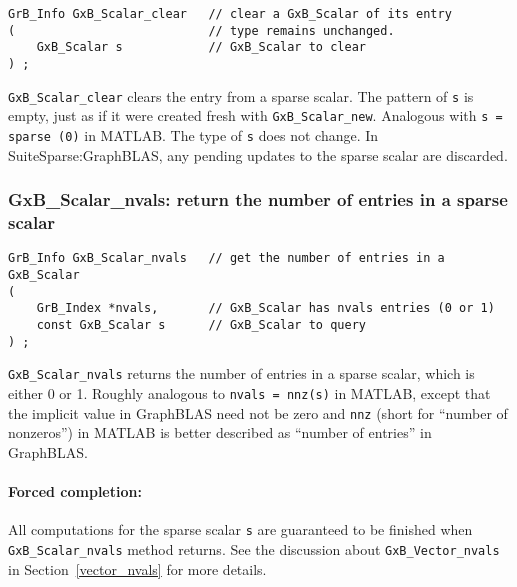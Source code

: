 \documentclass[12pt]{article}
\begin{document}
\begin{mdframed}[userdefinedwidth=6in]
{\footnotesize
\begin{verbatim}
GrB_Info GxB_Scalar_clear   // clear a GxB_Scalar of its entry
(                           // type remains unchanged.
    GxB_Scalar s            // GxB_Scalar to clear
) ;
\end{verbatim}
} \end{mdframed}

\verb'GxB_Scalar_clear' clears the entry from a sparse scalar.  The pattern of
\verb's' is empty, just as if it were created fresh with \verb'GxB_Scalar_new'.
Analogous with \verb's = sparse (0)' in MATLAB.  The type of \verb's' does not
change.  In SuiteSparse:GraphBLAS, any pending updates to the sparse scalar are
discarded.

\newpage
\subsubsection{{\sf GxB\_Scalar\_nvals:} return the number of entries in a sparse scalar}
\label{scalar_nvals}

\begin{mdframed}[userdefinedwidth=6in]
{\footnotesize
\begin{verbatim}
GrB_Info GxB_Scalar_nvals   // get the number of entries in a GxB_Scalar
(
    GrB_Index *nvals,       // GxB_Scalar has nvals entries (0 or 1)
    const GxB_Scalar s      // GxB_Scalar to query
) ;
\end{verbatim}
} \end{mdframed}

\verb'GxB_Scalar_nvals' returns the number of entries in a sparse scalar, which
is either 0 or 1.  Roughly analogous to \verb'nvals = nnz(s)' in MATLAB, except
that the implicit value in GraphBLAS need not be zero and \verb'nnz' (short for
``number of nonzeros'') in MATLAB is better described as ``number of entries''
in GraphBLAS.

\paragraph{Forced completion:}
All computations for the sparse scalar \verb's' are guaranteed to be finished
when \verb'GxB_Scalar_nvals' method returns.  See the discussion about
\verb'GxB_Vector_nvals' in Section~\ref{vector_nvals} for more details.
\end{document}
